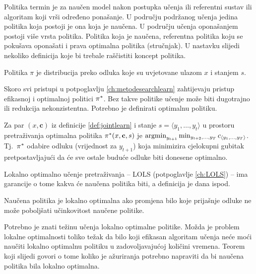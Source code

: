 Politika  termin je za naučen model nakon postupka učenja ili
referentni sustav ili algoritam koji vrši određeno ponašanje. U području
podržanog učenja jedina politika koja postoji je ona koja je naučena. U području
učenja oponašanjem  postoji više vrsta politika. Politika
koja je naučena, referentna politika koju se pokušava oponašati i prava optimalna
politika (stručnjak). U nastavku slijedi nekoliko definicija koje bi trebale
raščistiti koncept politika.

\begin{definition}[Politika]

  Politika $\pi$ je distribucija preko odluka koje su uvjetovane ulazom $x$ i
  stanjem $s$.

\end{definition}

\noindent
Skoro svi pristupi u potpoglavlju \ref{ch:metodesearchlearn} zahtijevaju pristup
efikasnoj i optimalnoj politici $\pi\ssymbol{1}$. Bez takve politike učenje može
biti dugotrajno ili redukcija nekonzistentna. Potrebno je definirati optimalnu
politiku.

\begin{definition}\label{def:optimalpolicy}

  Za par $(x, \mathbf{c})$ iz definicije \ref{def:jointlearn} i stanje $s =
  \langle y_1, \ldots, y_t \rangle$ u prostoru pretraživanja optimalna politika
  $\pi\ssymbol{1}(x, \mathbf{c}, s)$ je $\operatorname*{argmin}_{y_{t+1}} \min_{y_{t+2},
  \ldots, y_T} c_{\langle y_1, \ldots, y_T \rangle}$. Tj.~$\pi\ssymbol{1}$
  odabire odluku (vrijednost za $y_{t+1}$) koja minimizira cjelokupni gubitak
  pretpostavljajući da će sve ostale buduće odluke biti donesene optimalno.

\end{definition}

\noindent
Lokalno optimalno učenje pretraživanja -- \textsc{LOLS} (potpoglavlje
\ref{ch:LOLS}) --  ima garancije o tome kakva će naučena politika biti, a
definicija je dana ispod.

\begin{definition}

  Naučena politika je lokalno optimalna ako promjena bilo koje prijašnje odluke
  ne može poboljšati učinkovitost naučene politike.

\end{definition}

\noindent
Potrebno je znati težinu učenja lokalno optimalne politike. Možda je problem
lokalne optimalnosti toliko težak da bilo koji efikasan algoritam učenja neće
moći naučiti lokalno optimalnu politiku u zadovoljavajućoj količini vremena.
Teorem koji slijedi govori o tome koliko je ažuriranja potrebno napraviti da bi
naučena politika bila lokalno optimalna.

